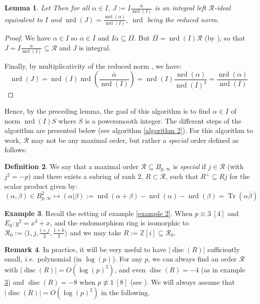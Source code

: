 \documentclass[a4paper,10pt]{report}
\theoremstyle{definition}
\newtheorem{definition}{Definition}[chapter]
\theoremstyle{plain}
\newtheorem{lemma}[definition]{Lemma}
\theoremstyle{definition}
\newtheorem{remark}[definition]{Remark}
\newtheorem{example}[definition]{Example}
\newcommand{\ie}{\emph{i.e.}\ }
\newcommand{\Z}{\mathbb{Z}}
\newcommand{\m}[1]{\mathcal{#1}}
\renewcommand{\(}{\left(}
\renewcommand{\)}{\right)}
\DeclareMathOperator{\Tr}{Tr}
\DeclareMathOperator{\disc}{disc}
\DeclareMathOperator{\nrd}{nrd}
\begin{document}
\begin{lemma}\label{lemma 5}
Let  Then for all $\alpha\in I$, $J:=I\frac{\overline{\alpha}}{\nrd(I)}$ is an integral left $\m{R}$-ideal equivalent to $I$ and $\nrd(J)=\frac{\nrd(\alpha)}{\nrd(I)}$, $\nrd$ being the reduced norm.
\end{lemma}

\begin{proof}
We have $\alpha\in I$ so $\overline{\alpha}\in \overline{I}$ and $I\overline{\alpha}\subseteq I\overline{I}$. But $I\overline{I}=\nrd(I)\m{R}$ (by \cite[16.6.14]{Voight}), so that $J=I\frac{\overline{\alpha}}{\nrd(I)}\subseteq \m{R}$ and $J$ is integral. 

Finally, by multiplicativity of the reduced norm \cite[lemma 16.3.7]{Voight}, we have:
\[\nrd(J)=\nrd(I)\nrd\(\frac{\overline{\alpha}}{\nrd(I)}\)=\nrd(I)\frac{\nrd(\alpha)}{\nrd(I)^2}=\frac{\nrd(\alpha)}{\nrd(I)}\]
\end{proof}

Hence, by the preceding lemma, the goal of this algorithm is to find $\alpha\in I$ of norm $\nrd(I)S$ where $S$ is a powersmooth integer.  The different steps of the algorithm are presented below (see algorithm \ref{algorithm 2}). For this algorithm to work, $\m{R}$ may not be any maximal order, but rather a \emph{special} order defined as follows:

\begin{definition}\label{definition 2}
We say that a maximal order $\m{R}\subseteq B_{p,\infty}$ is \emph{special} if $j\in \m{R}$ (with $j^2=-p$) and there exists a subring of rank $2$, $R\subset\m{R}$, such that $R^\bot\subseteq Rj$ for the scalar product given by:
\[(\alpha,\beta)\in B_{p,\infty}^2\longmapsto (\alpha|\beta):=\nrd(\alpha+\beta)-\nrd(\alpha)-\nrd(\beta)=\Tr(\alpha\overline{\beta})\]
\end{definition}

\begin{example}\label{example 3}
Recall the setting of example \ref{example 2}. When $p\equiv 3 \ [4]$ and $E_0: y^2=x^3+x$,  and the endomorphism ring is isomorphic to $\m{R}_0:= \langle 1,j, \frac{i+j}{2},\frac{1+k}{2}\rangle$ and we may take $R:=\Z[i]\subseteq\m{R}_0$.
\end{example}

\begin{remark}
In practice, it will be very useful to have $|\disc(R)|$ sufficiently small, \ie  polynomial (in $\log(p)$).  For any $p$, we can always find an order $\m{R}$ with $|\disc(R)|=O(\log(p)^2)$, and even $\disc(R)=-4$ (as in example \ref{example 3}) and $\disc(R)=-8$ when $p\not\equiv 1 \ [8]$ (see \cite[section 2.3]{KLPT}). We will always assume that $|\disc(R)|=O(\log(p)^2)$ in the following.
\end{remark}
\end{document}
